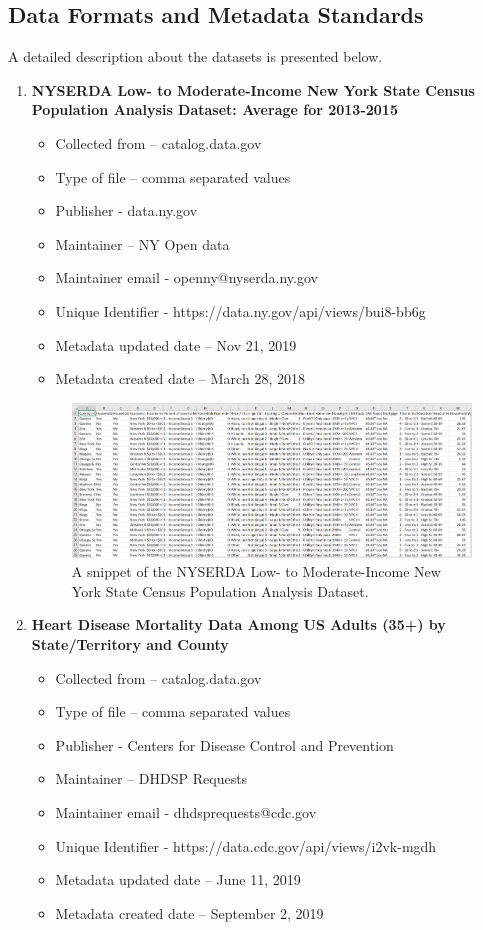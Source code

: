 \documentclass[journal,12pt,onecolumn]{IEEEtran}
\begin{document}
\subsection{Data Formats and Metadata Standards}
A detailed description about the datasets is presented below.
\begin{enumerate}
\item \textbf{NYSERDA Low- to Moderate-Income New York State Census Population Analysis Dataset: Average for 2013-2015}
\begin{itemize}
\item	Collected from – catalog.data.gov
\item	Type of file – comma separated values
\item	Publisher - data.ny.gov
\item	Maintainer – NY Open data
\item	Maintainer email - openny@nyserda.ny.gov
\item	Unique Identifier - https://data.ny.gov/api/views/bui8-bb6g
\item	Metadata updated date – Nov 21, 2019
\item	Metadata created date – March 28, 2018
\end{itemize}

\begin{figure}[H]
\caption{A snippet of the NYSERDA Low- to Moderate-Income New York State Census Population Analysis Dataset.}
\centering
\includegraphics[width=\textwidth]{figures/data_mi.PNG}
\end{figure}

\item \textbf{Heart Disease Mortality Data Among US Adults (35+) by State/Territory and County}
\begin{itemize}
\item	Collected from – catalog.data.gov
\item	Type of file – comma separated values
\item	Publisher - Centers for Disease Control and Prevention
\item	Maintainer – DHDSP Requests
\item	Maintainer email - dhdsprequests@cdc.gov
\item	Unique Identifier - https://data.cdc.gov/api/views/i2vk-mgdh
\item	Metadata updated date – June 11, 2019
\item	Metadata created date – September 2, 2019
\end{itemize}


\end{enumerate}
\end{document}
